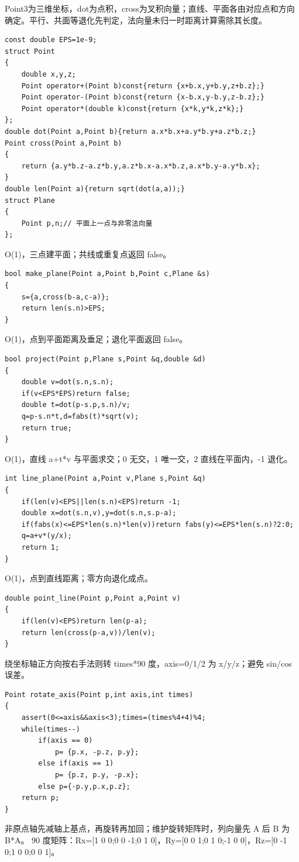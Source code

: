 \documentclass[UTF8,fontset=fandol,a4paper,twoside]{ctexart}
\newcommand{\note}[1]{{\fontsize{10}{12}\selectfont #1\par}}
\begin{document}
\begin{multicols}{2}
\note{Point3为三维坐标，dot为点积，cross为叉积向量；直线、平面各由对应点和方向确定。平行、共面等退化先判定，法向量未归一时距离计算需除其长度。}
\begin{lstlisting}
const double EPS=1e-9;
struct Point
{
    double x,y,z;
    Point operator+(Point b)const{return {x+b.x,y+b.y,z+b.z};}
    Point operator-(Point b)const{return {x-b.x,y-b.y,z-b.z};}
    Point operator*(double k)const{return {x*k,y*k,z*k};}
};
double dot(Point a,Point b){return a.x*b.x+a.y*b.y+a.z*b.z;}
Point cross(Point a,Point b)
{
    return {a.y*b.z-a.z*b.y,a.z*b.x-a.x*b.z,a.x*b.y-a.y*b.x};
}
double len(Point a){return sqrt(dot(a,a));}
struct Plane
{
    Point p,n;// 平面上一点与非零法向量
};
\end{lstlisting}
\note{O(\allowbreak{}1)\allowbreak{}，三点建平面；共线或重复点返回 false。}
\begin{lstlisting}
bool make_plane(Point a,Point b,Point c,Plane &s)
{
    s={a,cross(b-a,c-a)};
    return len(s.n)>EPS;
}
\end{lstlisting}
\note{O(\allowbreak{}1)\allowbreak{}，点到平面距离及垂足；退化平面返回 false。}
\begin{lstlisting}
bool project(Point p,Plane s,Point &q,double &d)
{
    double v=dot(s.n,s.n);
    if(v<EPS*EPS)return false;
    double t=dot(p-s.p,s.n)/v;
    q=p-s.n*t,d=fabs(t)*sqrt(v);
    return true;
}
\end{lstlisting}
\note{O(\allowbreak{}1)\allowbreak{}，直线 a+\allowbreak{}t*v 与平面求交；0 无交，1 唯一交，2 直线在平面内，-\allowbreak{}1 退化。}
\begin{lstlisting}
int line_plane(Point a,Point v,Plane s,Point &q)
{
    if(len(v)<EPS||len(s.n)<EPS)return -1;
    double x=dot(s.n,v),y=dot(s.n,s.p-a);
    if(fabs(x)<=EPS*len(s.n)*len(v))return fabs(y)<=EPS*len(s.n)?2:0;
    q=a+v*(y/x);
    return 1;
}
\end{lstlisting}
\note{O(\allowbreak{}1)\allowbreak{}，点到直线距离；零方向退化成点。}
\begin{lstlisting}
double point_line(Point p,Point a,Point v)
{
    if(len(v)<EPS)return len(p-a);
    return len(cross(p-a,v))/len(v);
}
\end{lstlisting}
\note{绕坐标轴正方向按右手法则转 times*90 度，axis=\allowbreak{}0/\allowbreak{}1/\allowbreak{}2 为 x/\allowbreak{}y/\allowbreak{}z；避免 sin/\allowbreak{}cos 误差。}
\begin{lstlisting}
Point rotate_axis(Point p,int axis,int times)
{
    assert(0<=axis&&axis<3);times=(times%4+4)%4;
    while(times--)
        if(axis == 0)
            p= {p.x, -p.z, p.y};
        else if(axis == 1)
            p= {p.z, p.y, -p.x};
        else p={-p.y,p.x,p.z};
    return p;
}
\end{lstlisting}
\note{非原点轴先减轴上基点，再旋转再加回；维护旋转矩阵时，列向量先 A 后 B 为 B*A。 90 度矩阵：Rx=\allowbreak{}[\allowbreak{}1 0 0;0 0 -\allowbreak{}1;0 1 0]\allowbreak{}，Ry=\allowbreak{}[\allowbreak{}0 0 1;0 1 0;-\allowbreak{}1 0 0]\allowbreak{}，Rz=\allowbreak{}[\allowbreak{}0 -\allowbreak{}1 0;1 0 0;0 0 1]\allowbreak{}。}

\end{multicols}
\end{document}
